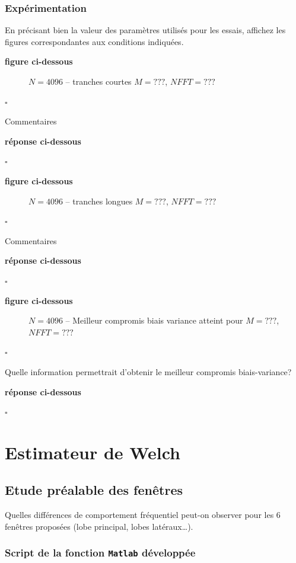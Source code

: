 \documentclass{article}
\newcommand{\debutrep}[1]{\color{blue}\begin{center} \hrulefill \textbf{ #1 } \hrulefill \end{center} }
\newcommand{\finrep}{\vspace*{5mm}\hfill $\square$\color{black}\vspace*{5mm}}
\begin{document}
\subsubsection{Expérimentation}

En précisant bien la valeur des paramètres utilisés pour les essais, affichez les figures correspondantes aux conditions indiquées.
\debutrep{figure ci-dessous}

\begin{figure}[h]

\caption{$N=4096$ -- tranches courtes $M = ??? $, $NFFT = ???$}
\end{figure}
\finrep

Commentaires
\debutrep{réponse ci-dessous}

\finrep

\debutrep{figure ci-dessous}
\begin{figure}[h]

\caption{$N=4096$ -- tranches longues $M = ???$, $NFFT = ???$}
\end{figure}

\finrep

Commentaires
\debutrep{réponse ci-dessous}

\finrep

\debutrep{figure ci-dessous}
\begin{figure}[h]

\caption{$N=4096$ -- \og Meilleur \fg compromis biais variance atteint pour $M = ???$, $NFFT = ???$}
\end{figure}

\finrep

Quelle information permettrait d'obtenir le meilleur compromis biais-variance? 

\debutrep{réponse ci-dessous}

\finrep

\clearpage
\section{Estimateur de Welch}

\subsection{Etude préalable des fenêtres}

Quelles différences de comportement fréquentiel peut-on observer pour les 6 fenêtres proposées (lobe principal, lobes latéraux\ldots).

\subsubsection{Script de la fonction {\tt Matlab} développée}
\end{document}

